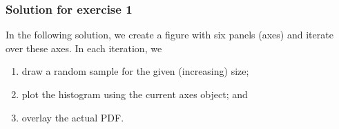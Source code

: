 \documentclass{scrartcl}
\providecommand{\tightlist}{%
      \setlength{\itemsep}{0pt}\setlength{\parskip}{0pt}}
\begin{document}
    \hypertarget{solution-for-exercise-1}{%
\subsubsection{Solution for exercise 1}\label{solution-for-exercise-1}}

In the following solution, we create a figure with six panels (axes) and
iterate over these axes. In each iteration, we

\begin{enumerate}
\def\labelenumi{\arabic{enumi}.}
\tightlist
\item
  draw a random sample for the given (increasing) size;
\item
  plot the histogram using the current axes object; and
\item
  overlay the actual PDF.
\end{enumerate}
\end{document}
